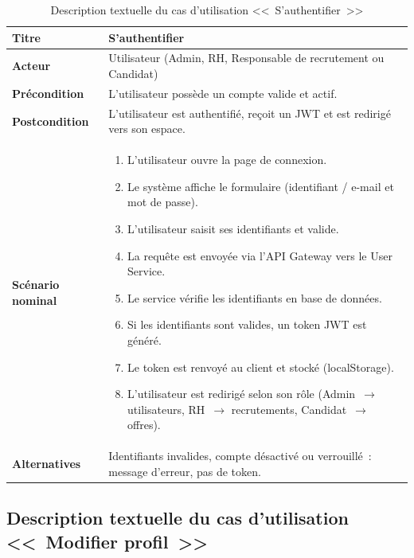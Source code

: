 \begin{table}[htbp]
  \centering
  \small
  \caption{Description textuelle du cas d'utilisation <<~S'authentifier~>>}
  \label{tab:uc-login}
  \begin{tabular}{|p{3.0cm}|p{10.2cm}|}
    \hline
    \textbf{Titre} & S'authentifier \\
    \hline
    \textbf{Acteur} & Utilisateur (Admin, RH, Responsable de recrutement ou Candidat) \\
    \hline
    \textbf{Précondition} & L'utilisateur possède un compte valide et actif. \\
    \hline
    \textbf{Postcondition} & L'utilisateur est authentifié, reçoit un JWT et est redirigé vers son espace. \\
    \hline
    \textbf{Scénario nominal}
    &
    \begin{enumerate}[leftmargin=*,itemsep=0.15em,topsep=0.2em]
      \item L'utilisateur ouvre la page de connexion.
      \item Le système affiche le formulaire (identifiant / e-mail et mot de passe).
      \item L'utilisateur saisit ses identifiants et valide.
      \item La requête est envoyée via l'API Gateway vers le User Service.
      \item Le service vérifie les identifiants en base de données.
      \item Si les identifiants sont valides, un token JWT est généré.
      \item Le token est renvoyé au client et stocké (localStorage).
      \item L'utilisateur est redirigé selon son rôle
            (Admin~$\rightarrow$ utilisateurs, RH~$\rightarrow$ recrutements,
            Candidat~$\rightarrow$ offres).
    \end{enumerate}
    \\
    \hline
    \textbf{Alternatives}
    & Identifiants invalides, compte désactivé ou verrouillé~: message d'erreur, pas de token. \\
    \hline
  \end{tabular}
\end{table}


\subsection{Description textuelle du cas d'utilisation <<~Modifier profil~>>}

